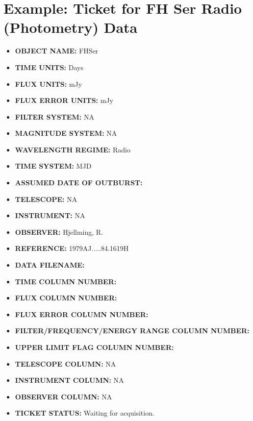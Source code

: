 \documentclass{article}
\begin{document}
\section{Example: Ticket for FH Ser Radio (Photometry) Data}
\label{sec:ExampTickPhot}
\begin{itemize}
\item \textbf{OBJECT NAME:} FHSer
\item \textbf{TIME UNITS:} Days
\item \textbf{FLUX UNITS:} mJy
\item \textbf{FLUX ERROR UNITS:} mJy
\item \textbf{FILTER SYSTEM:} NA
\item \textbf{MAGNITUDE SYSTEM:} NA
\item \textbf{WAVELENGTH REGIME:} Radio
\item \textbf{TIME SYSTEM:} MJD
\item \textbf{ASSUMED DATE OF OUTBURST:}
\item \textbf{TELESCOPE:} NA
\item \textbf{INSTRUMENT:} NA
\item \textbf{OBSERVER:} Hjellming, R.
\item \textbf{REFERENCE:} 1979AJ.....84.1619H
\item \textbf{DATA FILENAME:}
\item \textbf{TIME COLUMN NUMBER:}
\item \textbf{FLUX COLUMN NUMBER:} 
\item \textbf{FLUX ERROR COLUMN NUMBER:} 
\item \textbf{FILTER/FREQUENCY/ENERGY RANGE COLUMN NUMBER:} 
\item \textbf{UPPER LIMIT FLAG COLUMN NUMBER:} 
\item \textbf{TELESCOPE COLUMN:} NA
\item \textbf{INSTRUMENT COLUMN:} NA
\item \textbf{OBSERVER COLUMN:} NA
\item \textbf{TICKET STATUS:} Waiting for acquisition.
\end{itemize}






\newpage
\end{document}
